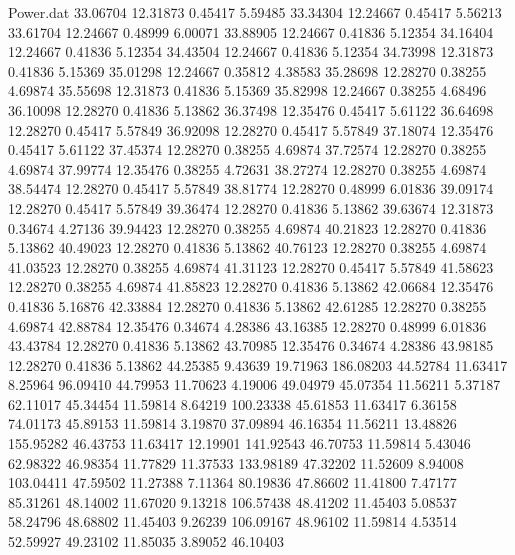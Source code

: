 \begin{filecontents}{Power.dat}
  33.06704   12.31873    0.45417    5.59485
  33.34304   12.24667    0.45417    5.56213
  33.61704   12.24667    0.48999    6.00071
  33.88905   12.24667    0.41836    5.12354
  34.16404   12.24667    0.41836    5.12354
  34.43504   12.24667    0.41836    5.12354
  34.73998   12.31873    0.41836    5.15369
  35.01298   12.24667    0.35812    4.38583
  35.28698   12.28270    0.38255    4.69874
  35.55698   12.31873    0.41836    5.15369
  35.82998   12.24667    0.38255    4.68496
  36.10098   12.28270    0.41836    5.13862
  36.37498   12.35476    0.45417    5.61122
  36.64698   12.28270    0.45417    5.57849
  36.92098   12.28270    0.45417    5.57849
  37.18074   12.35476    0.45417    5.61122
  37.45374   12.28270    0.38255    4.69874
  37.72574   12.28270    0.38255    4.69874
  37.99774   12.35476    0.38255    4.72631
  38.27274   12.28270    0.38255    4.69874
  38.54474   12.28270    0.45417    5.57849
  38.81774   12.28270    0.48999    6.01836
  39.09174   12.28270    0.45417    5.57849
  39.36474   12.28270    0.41836    5.13862
  39.63674   12.31873    0.34674    4.27136
  39.94423   12.28270    0.38255    4.69874
  40.21823   12.28270    0.41836    5.13862
  40.49023   12.28270    0.41836    5.13862
  40.76123   12.28270    0.38255    4.69874
  41.03523   12.28270    0.38255    4.69874
  41.31123   12.28270    0.45417    5.57849
  41.58623   12.28270    0.38255    4.69874
  41.85823   12.28270    0.41836    5.13862
  42.06684   12.35476    0.41836    5.16876
  42.33884   12.28270    0.41836    5.13862
  42.61285   12.28270    0.38255    4.69874
  42.88784   12.35476    0.34674    4.28386
  43.16385   12.28270    0.48999    6.01836
  43.43784   12.28270    0.41836    5.13862
  43.70985   12.35476    0.34674    4.28386
  43.98185   12.28270    0.41836    5.13862
  44.25385    9.43639   19.71963  186.08203
  44.52784   11.63417    8.25964   96.09410
  44.79953   11.70623    4.19006   49.04979
  45.07354   11.56211    5.37187   62.11017
  45.34454   11.59814    8.64219  100.23338
  45.61853   11.63417    6.36158   74.01173
  45.89153   11.59814    3.19870   37.09894
  46.16354   11.56211   13.48826  155.95282
  46.43753   11.63417   12.19901  141.92543
  46.70753   11.59814    5.43046   62.98322
  46.98354   11.77829   11.37533  133.98189
  47.32202   11.52609    8.94008  103.04411
  47.59502   11.27388    7.11364   80.19836
  47.86602   11.41800    7.47177   85.31261
  48.14002   11.67020    9.13218  106.57438
  48.41202   11.45403    5.08537   58.24796
  48.68802   11.45403    9.26239  106.09167
  48.96102   11.59814    4.53514   52.59927
  49.23102   11.85035    3.89052   46.10403

\end{filecontents}

